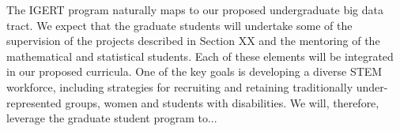 The IGERT program naturally maps to our proposed undergraduate big data tract. We expect that the graduate students will undertake some of the supervision of the projects described in Section XX and the mentoring of the mathematical and statistical students. Each of these elements will be integrated in our proposed curricula. One of the key goals is developing a diverse STEM workforce, including strategies for recruiting and retaining traditionally under-represented groups, women and students with disabilities.  We will, therefore, leverage the graduate student program to...

